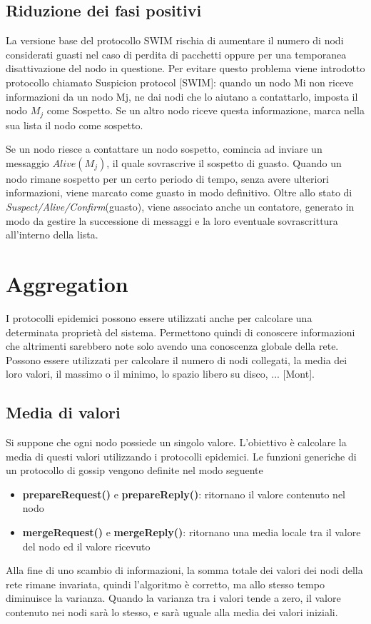 \subsection{Riduzione dei fasi positivi}
La versione base del protocollo SWIM rischia di aumentare il numero di nodi considerati guasti nel caso di perdita di pacchetti oppure per una temporanea disattivazione del nodo in questione. Per evitare questo problema viene introdotto protocollo  chiamato Suspicion protocol [SWIM]: quando un nodo Mi non riceve informazioni da un nodo Mj, ne dai nodi che lo aiutano a contattarlo, imposta il nodo $M_j$ come Sospetto. Se un altro nodo riceve questa informazione, marca nella sua lista il nodo come sospetto.

Se un nodo riesce a contattare un nodo sospetto, comincia ad inviare un messaggio $Alive(M_j)$, il quale sovrascrive il sospetto di guasto. Quando un nodo rimane sospetto per un certo periodo di tempo, senza avere ulteriori informazioni, viene marcato come guasto in modo definitivo. Oltre allo stato di \textit{Suspect/Alive/Confirm}(guasto), viene associato anche un contatore, generato in modo da gestire la successione di messaggi e la loro eventuale sovrascrittura all’interno della lista.

\section{Aggregation}
I protocolli epidemici possono essere utilizzati anche per calcolare una determinata proprietà del sistema. Permettono quindi di conoscere informazioni che altrimenti sarebbero note solo avendo una conoscenza globale della rete. Possono essere utilizzati per calcolare il numero di nodi collegati, la media dei loro valori, il massimo o il minimo, lo spazio libero su disco, ... [Mont].

\subsection{Media di valori}
Si suppone che ogni nodo possiede un singolo valore. L'obiettivo è calcolare la media di questi valori utilizzando i protocolli epidemici. Le funzioni generiche di un protocollo di gossip vengono definite nel modo seguente
\begin{itemize}
    \item \textbf{prepareRequest()} e \textbf{prepareReply()}: ritornano il valore contenuto nel nodo
    \item \textbf{mergeRequest()} e \textbf{mergeReply()}: ritornano una media locale tra il valore del nodo ed il valore ricevuto
\end{itemize}
Alla fine di uno scambio di informazioni, la somma totale dei valori dei nodi della rete rimane invariata, quindi l'algoritmo è corretto, ma allo stesso tempo diminuisce la varianza. Quando la varianza tra i valori tende a zero, il valore contenuto nei nodi sarà lo stesso, e sarà uguale alla media dei valori iniziali.

